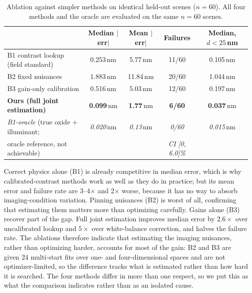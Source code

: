 \documentclass[10pt]{article}
\begin{document}
\begin{table}[h]
\centering
\caption{Ablation against simpler methods on identical held-out scenes ($n{=}60$). All four methods and the oracle are evaluated on the same $n{=}60$ scenes.}
\label{tab:baselines}
\begin{tabular}{lcccc}
\toprule
 & Median $|$err$|$ & Mean $|$err$|$ & Failures & Median, $d<25$\,nm \\
\midrule
B1 contrast lookup (field standard) & 0.253\,nm & 5.77\,nm & 11/60 & 0.105\,nm \\
B2 fixed nuisances & 1.883\,nm & 11.84\,nm & 20/60 & 1.044\,nm \\
B3 gain-only calibration & 0.516\,nm & 5.03\,nm & 12/60 & 0.197\,nm \\
\textbf{Ours (full joint estimation)} & \textbf{0.099}\,nm & \textbf{1.77}\,nm & \textbf{6/60} & \textbf{0.037}\,nm \\
\midrule
\emph{B1-oracle} (true oxide + illuminant; & \emph{0.020}\,nm & \emph{0.13}\,nm & \emph{0/60} & \emph{0.015}\,nm \\
\quad oracle reference, not achievable) & & & \emph{CI [0, 6.0]\%} & \\
\bottomrule
\end{tabular}
\end{table}

Correct physics alone (B1) is already competitive in median error, which is why calibrated-contrast methods work as well as they do in practice; but its mean error and failure rate are 3--4$\times$ and 2$\times$ worse, because it has no way to absorb imaging-condition variation. Pinning nuisances (B2) is worst of all, confirming that estimating them matters more than optimizing carefully. Gains alone (B3) recover part of the gap. Full joint estimation improves median error by $2.6\times$ over uncalibrated lookup and $5\times$ over white-balance correction, and halves the failure rate. The ablations therefore indicate that estimating the imaging nuisances, rather than optimizing harder, accounts for most of the gain: B2 and B3 are given 24 multi-start fits over one- and four-dimensional spaces and are not optimizer-limited, so the difference tracks what is estimated rather than how hard it is searched. The four methods differ in more than one respect, so we put this as what the comparison indicates rather than as an isolated cause.
\end{document}
